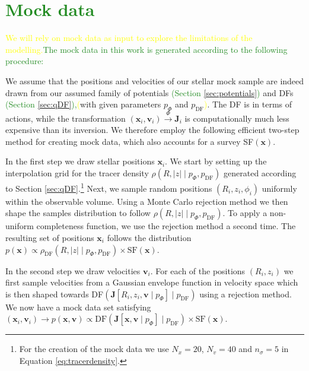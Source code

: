 \documentclass[iop,revtex4,numberedappendix,appendixfloats]{emulateapj}
\newcommand{\vect}[1]{\boldsymbol{#1}}
\newcommand{\NEW}[1]{\textcolor{ForestGreen}{#1}}
\newcommand{\OLD}[1]{\textcolor{Yellow}{#1}}%
\begin{document}
\appendix
\section{\NEW{Mock data}} \label{app:mockdata}

\OLD{We will rely on mock data as input to explore the limitations of the modelling.}\NEW{The mock data in this work is generated according to the following procedure:} 

We assume that the positions and velocities of our stellar mock sample are indeed drawn from our assumed family of potentials \NEW{(Section \ref{sec:potentials})} and DFs \NEW{(Section \ref{sec:qDF}),}\OLD{(}with given parameters $p_\Phi$ and $p_\text{DF}$\OLD{)}. The DF is in terms of actions, while the transformation $(\vect{x}_i,\vect{v}_i) \stackrel{\Phi}{\longrightarrow} \vect{J}_i$ is computationally much less expensive than its inversion. We therefore employ the following efficient two-step method for creating mock data, which also accounts for a survey SF$(\vect{x})$.

In the first step we draw stellar positions $\vect{x}_i$. We start by setting up the interpolation grid for the tracer density $\rho(R,|z| \mid p_\Phi, p_\text{DF})$ generated according to Section \ref{sec:qDF}.\footnote{For the creation of the mock data we use $N_x = 20$, $N_v = 40$ and $n_\sigma=5$ in Equation \eqref{eq:tracerdensity}.} Next, we sample random positions $(R_i,z_i,\phi_i)$ uniformly within the observable volume. Using a Monte Carlo rejection method we then shape the samples distribution to follow $\rho(R,|z| \mid p_\Phi, p_\text{DF})$. To apply a non-uniform completeness function, we use the rejection method a second time. The resulting set of positions $\vect{x}_i$ follows the distribution $p(\vect{x}) \propto \rho_\text{DF}(R,|z| \mid p_{\Phi},p_\text{DF}) \times \text{SF}(\vect{x})$.

In the second step we draw velocities $\vect{v}_i$. For each of the positions $(R_i,z_i)$ we first sample velocities from a Gaussian envelope function in velocity space which is then shaped towards DF$(\vect{J}[R_i,z_i,\vect{v} \mid p_{\Phi}] \mid p_\text{DF})$ using a rejection method. We now have a mock data set satisfying $(\vect{x}_i,\vect{v}_i) \longrightarrow p(\vect{x},\vect{v}) \propto \text{DF}(\vect{J}[\vect{x},\vect{v} \mid p_{\Phi}] \mid p_\text{DF}) \times \text{SF}(\vect{x})$.
\end{document}
